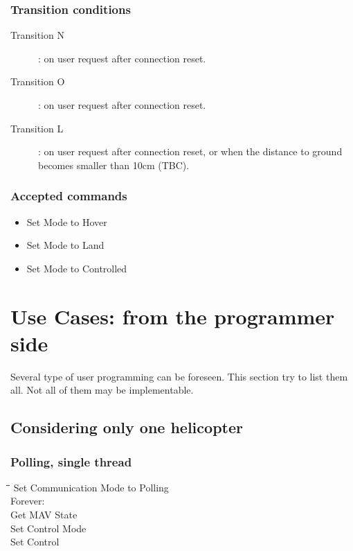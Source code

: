 \documentclass{article}
\begin{document}
\subsubsection{Transition conditions}
\begin{description}
\item[Transition N]: on user request after connection reset.
\item[Transition O]: on user request after connection reset.
\item[Transition L]: on user request after connection reset, or when the
distance to ground becomes smaller than 10cm (TBC).
\end{description}
\subsubsection{Accepted commands}
\begin{itemize}
\item Set Mode to Hover
\item Set Mode to Land
\item Set Mode to Controlled
\end{itemize}


\newpage
\section{Use Cases: from the programmer side}
\label{sec:usecases}
Several type of user programming can be foreseen. This section try to list them
all. Not all of them may be implementable.

\subsection{Considering only one helicopter}
\subsubsection{Polling, single thread}
\begin{tabbing}
\=\hspace{1cm}\=\hspace{6cm}\=\kill
Set Communication Mode to Polling\\
\>Forever:\\
\>\>Get MAV State\\
\>\>Set Control Mode\\
\>\>Set Control 
\end{tabbing}
\end{document}

